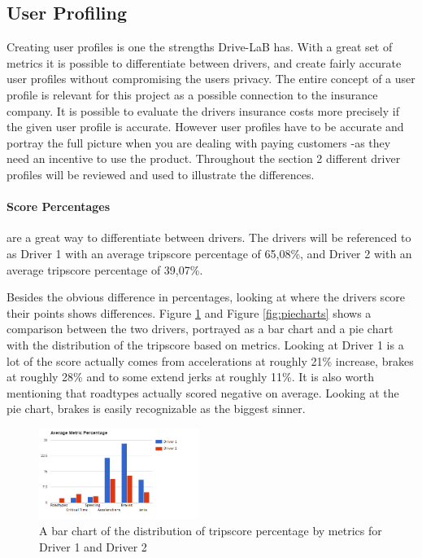 \subsection{User Profiling}\label{subsec:userprofiling}

Creating user profiles is one the strengths Drive-LaB has. With a great set of metrics it is possible to differentiate between drivers, and create fairly accurate user profiles without compromising the users privacy. The entire concept of a user profile is relevant for this project as a possible connection to the insurance company. It is possible to evaluate the drivers insurance costs more precisely if the given user profile is accurate. However user profiles have to be accurate and portray the full picture when you are dealing with paying customers\citep{art:insurtelematics} -as they need an incentive to use the product. Throughout the section 2 different driver profiles will be reviewed and used to illustrate the differences. 

\paragraph{Score Percentages} are a great way to differentiate between drivers. The drivers will be referenced to as Driver 1 with an average tripscore percentage of 65,08\%, and Driver 2 with an average tripscore percentage of 39,07\%.

Besides the obvious difference in percentages, looking at where the drivers score their points shows differences. Figure \ref{fig:avgmetricper} and Figure \ref{fig:piecharts} shows a comparison between the two drivers, portrayed as a bar chart and a pie chart with the distribution of the tripscore based on metrics. Looking at Driver 1 is a lot of the score actually comes from accelerations at roughly 21\% increase, brakes at roughly 28\% and to some extend jerks at roughly 11\%. It is also worth mentioning that roadtypes actually scored negative on average. Looking at the pie chart, brakes is easily recognizable as the biggest sinner.

\begin{figure}[tb]
\centering
\includegraphics[width=0.465\textwidth]{Pictures/AverageMetricsPercentage}
\caption{A bar chart of the distribution of tripscore percentage by metrics for Driver 1 and Driver 2}
\label{fig:avgmetricper}
\end{figure}

